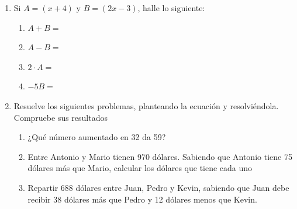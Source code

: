 \documentclass[fleqn]{article}
\begin{document}
\begin{enumerate}
{\begin{center}
\begin{tabular}{|l|l|l|l|l|}
  \end{tabular}
  \end{center}
}%
\noanswer
\newpage
  \item Si $A=(x+4)$ y $B=(2x-3)$, halle lo siguiente:
  \begin{enumerate}
   \item $A+B=$\noanswer[25pt]
   \item $A-B=$\noanswer[25pt]
   \item $2\cdot A=$\noanswer[25pt]
   \item $-5B=$\noanswer[25pt]
  \end{enumerate}
  \item Resuelve los siguientes problemas, planteando la ecuación y resolviéndola. Compruebe sus resultados
  \begin{enumerate}
   \item ¿Qué número aumentado en 32 da 59?\noanswer
   \item Entre Antonio y Mario tienen 970 dólares. Sabiendo que Antonio tiene 75 dólares más que Mario, calcular los dólares que tiene cada uno\noanswer
   \item Repartir 688 dólares entre Juan, Pedro y Kevin, sabiendo que Juan debe recibir 38 dólares más que Pedro y 12 dólares menos que Kevin.
  \end{enumerate}
\end{enumerate}
\end{document}

